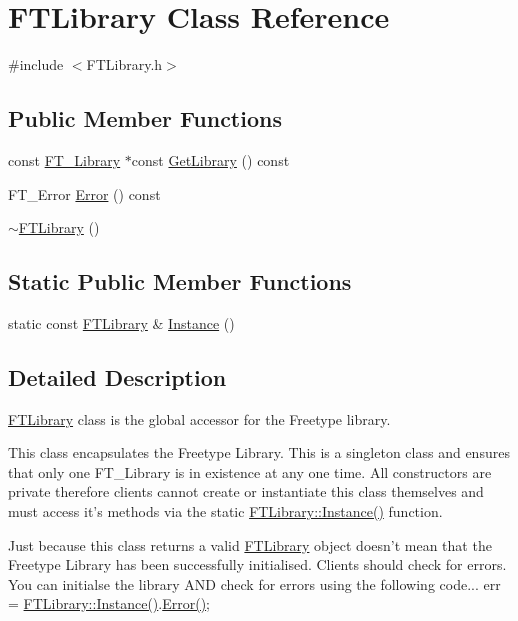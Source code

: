 \hypertarget{class_f_t_library}{
\section{FTLibrary Class Reference}
\label{class_f_t_library}
}


{\ttfamily \#include $<$FTLibrary.h$>$}

\subsection*{Public Member Functions}
\begin{DoxyCompactItemize}
\item 
const \hyperlink{struct_f_t___library_rec__}{FT\_\-Library} $\ast$const \hyperlink{class_f_t_library_afef4db019eae5a4307201b7abc6a88c7}{GetLibrary} () const 
\item 
FT\_\-Error \hyperlink{class_f_t_library_ad01e538ba8e308dddda5c4ec808ee404}{Error} () const 
\item 
\hyperlink{class_f_t_library_a8d1ee3dc3c4916b5b428e934dc46e9d7}{$\sim$FTLibrary} ()
\end{DoxyCompactItemize}
\subsection*{Static Public Member Functions}
\begin{DoxyCompactItemize}
\item 
static const \hyperlink{class_f_t_library}{FTLibrary} \& \hyperlink{class_f_t_library_aa172665a8db8888851895bcb15aa8103}{Instance} ()
\end{DoxyCompactItemize}


\subsection{Detailed Description}
\hyperlink{class_f_t_library}{FTLibrary} class is the global accessor for the Freetype library.

This class encapsulates the Freetype Library. This is a singleton class and ensures that only one FT\_\-Library is in existence at any one time. All constructors are private therefore clients cannot create or instantiate this class themselves and must access it's methods via the static {\ttfamily \hyperlink{class_f_t_library_aa172665a8db8888851895bcb15aa8103}{FTLibrary::Instance()}} function.

Just because this class returns a valid {\ttfamily \hyperlink{class_f_t_library}{FTLibrary}} object doesn't mean that the Freetype Library has been successfully initialised. Clients should check for errors. You can initialse the library AND check for errors using the following code... {\ttfamily err = \hyperlink{class_f_t_library_aa172665a8db8888851895bcb15aa8103}{FTLibrary::Instance()}.\hyperlink{class_f_t_library_ad01e538ba8e308dddda5c4ec808ee404}{Error()};}

